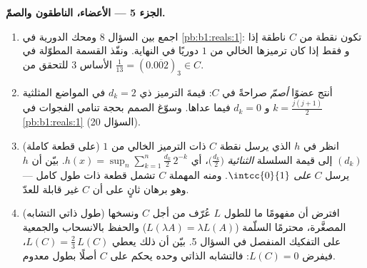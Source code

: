 \begin{problem}[{مسألة نهاية الأسبوع --- \omterm{pb:b1:topology:1}{مجموعة كانتور} ذات الأثلاث
الوسطى: طولها معدوم، وغير قابلة للعدّ، وتامّة، و $C + C =
\intcc{0}{2}$}]
\medskip
\noindent\textbf{الجزء 5 --- الأعضاء، الناطقون والصمّ.}
\begin{enumerate}[resume]
  \item اجمع بين السؤال 8 ومحك الدورية في
        \cref{pb:b1:reals:1}: تكون نقطة من $C$ ناطقة إذا و
        فقط إذا كان ترميزها الخالي من $1$ دوريًا في النهاية. ونفّذ
        القسمة المطوّلة في الأساس $3$ للتحقق من $\frac1{13} =
        (0.\overline{002})_3 \in C$.
  \item أنتج عضوًا \emph{أصمّ} صراحةً في $C$:
        قيمةَ الترميز ذي $d_k = 2$ في المواضع المثلثية
        $k = \frac{j(j+1)}{2}$ و $d_k = 0$
        فيما عداها. وسوّغ الصمم بحجة تنامي الفجوات في
        \cref{pb:b1:reals:1} (السؤال 20).
  \item (على قطعة كاملة) انظر في $h$ الذي يرسل نقطة
        $C$ ذات الترميز الخالي من $1$ $(d_k)$ إلى قيمة
        السلسلة \emph{الثنائية} $\bigl(\frac{d_k}2\bigr)$، أي
        $h(x) = \sup_n \sum_{k=1}^n \frac{d_k}{2}\,2^{-k}$.
        بيّن أن $h$ يرسل $C$ \emph{على} $\intcc{0}{1}$. ومنه
         المهملة $C$ تشمل قطعة ذات طول كامل
        --- وهو برهان ثانٍ على أن $C$ غير قابلة للعدّ.
  \item (طول ذاتي التشابه) افترض أن مفهومًا ما للطول $L$
        عُرّف من أجل $C$ ونسخها المصغَّرة، محترمًا
        السلّمة ($L(\lambda A) = \lambda L(A)$) والحفظ
        بالانسحاب والجمعية على التفكيك المنفصل
        في السؤال 5. بيّن أن ذلك يعطي $L(C) = \frac23\,L(C)$،
        فيفرض $L(C) = 0$: فالتشابه الذاتي وحده يحكم
        على $C$ أصلًا بطول معدوم.
\end{enumerate}


\end{problem}
